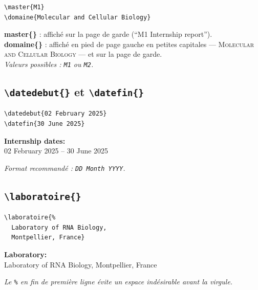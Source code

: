 \documentclass[12pt, a4paper]{article}
\begin{document}
\begin{demo}
\begin{lstlisting}[style=latexcode]
\master{M1}
\domaine{Molecular and Cellular Biology}
\end{lstlisting}
\tcblower
\textbf{master\{\}} : affiché sur la page de garde (``M1 Internship report'').\\[6pt]
\textbf{domaine\{\}} : affiché en pied de page gauche en petites capitales — \textsc{Molecular and Cellular Biology} — et sur la page de garde.\\[6pt]
{\footnotesize\itshape Valeurs possibles : \texttt{M1} ou \texttt{M2}.}
\end{demo}

\subsection[\texttt{\textbackslash datedebut} et \texttt{\textbackslash datefin}]{\texttt{\textbackslash datedebut\{\}} et \texttt{\textbackslash datefin\{\}}}

\begin{demo}
\begin{lstlisting}[style=latexcode]
\datedebut{02 February 2025}
\datefin{30 June 2025}
\end{lstlisting}
\tcblower
\begin{center}
\small\textbf{Internship dates:}\\
02 February 2025 -- 30 June 2025
\end{center}
{\footnotesize\itshape Format recommandé : \texttt{DD~Month~YYYY}.}
\end{demo}

\subsection{\texttt{\textbackslash laboratoire\{\}}}

\begin{demo}
\begin{lstlisting}[style=latexcode]
\laboratoire{%
  Laboratory of RNA Biology,
  Montpellier, France}
\end{lstlisting}
\tcblower
\begin{center}
\small\textbf{Laboratory:}\\
Laboratory of RNA Biology, Montpellier, France
\end{center}
{\footnotesize\itshape Le \texttt{\%} en fin de première ligne évite un espace indésirable avant la virgule.}
\end{demo}
\end{document}
